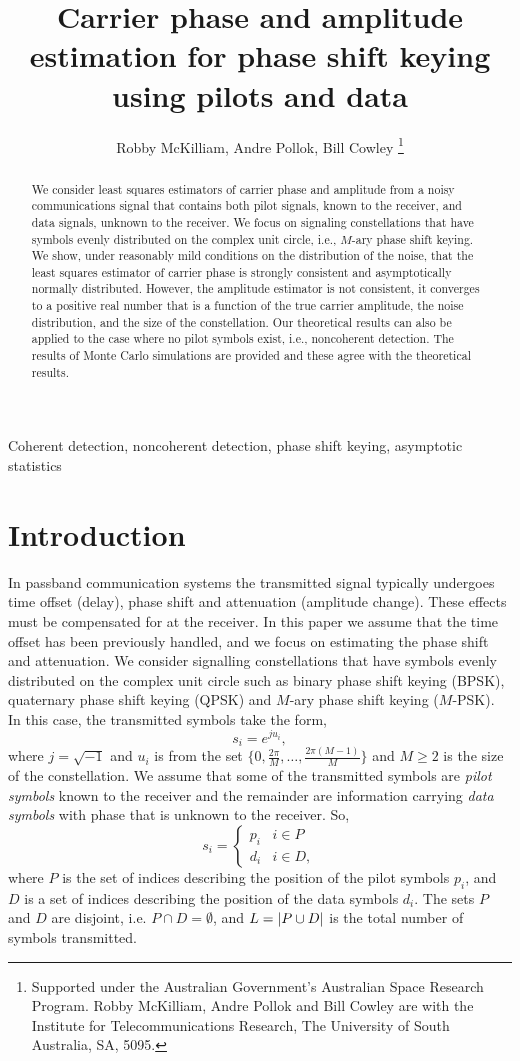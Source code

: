 \documentclass[journal]{IEEEtran}
\title{Carrier phase and amplitude estimation for phase shift keying using pilots and data}
\author{Robby McKilliam, Andre Pollok, Bill Cowley 
\thanks{
Supported under the Australian Government’s Australian Space Research Program.
Robby McKilliam, Andre Pollok and Bill Cowley are with the Institute for Telecommunications Research, The University of South Australia, SA, 5095.
}}
\begin{document}
\maketitle

\begin{abstract}
We consider least squares estimators of carrier phase and amplitude from a noisy communications signal that contains both pilot signals, known to the receiver, and data signals, unknown to the receiver.  We focus on signaling constellations that have symbols evenly distributed on the complex unit circle, i.e., $M$-ary phase shift keying.  We show, under reasonably mild conditions on the distribution of the noise, that the least squares estimator of carrier phase is strongly consistent and asymptotically normally distributed.  However, the amplitude estimator is not consistent, it converges to a positive real number that is a function of the true carrier amplitude, the noise distribution, and the size of the constellation.  Our theoretical results can also be applied to the case where no pilot symbols exist, i.e., noncoherent detection.  The results of Monte Carlo simulations are provided and these agree with the theoretical results.   
\end{abstract}
\begin{IEEEkeywords}
Coherent detection, noncoherent detection, phase shift keying, asymptotic statistics
\end{IEEEkeywords}

\section{Introduction}

In passband communication systems the transmitted signal typically undergoes time offset (delay), phase shift and attenuation (amplitude change).  These effects must be compensated for at the receiver. In this paper we assume that the time offset has been previously handled, and we focus on estimating the phase shift and attenuation.  We consider signalling constellations that have symbols evenly distributed on the complex unit circle such as binary phase shift keying (BPSK), quaternary phase shift keying (QPSK) and $M$-ary phase shift keying ($M$-PSK).  In this case, the transmitted symbols take the form,
\[
s_i = e^{j u_i},
\]
where $j = \sqrt{-1}$ and $u_i$ is from the set $\{0, \tfrac{2\pi}{M}, \dots, \tfrac{2\pi(M-1)}{M}\}$ and $M \geq 2$ is the size of the constellation.  We assume that some of the transmitted symbols are \emph{pilot symbols} known to the receiver and the remainder are information carrying \emph{data symbols} with phase that is unknown to the receiver.  So,
\[
s_i = \begin{cases}
p_i & i \in P \\
d_i & i \in D,
\end{cases}
\]
where $P$ is the set of indices describing the position of the pilot symbols $p_i$, and $D$ is a set of indices describing the position of the data symbols $d_i$.  The sets $P$ and $D$ are disjoint, i.e. $P \cap D = \emptyset$, and $L = {\left\vert P \cup D \right\vert}$ is the total number of symbols transmitted.
\end{document}

